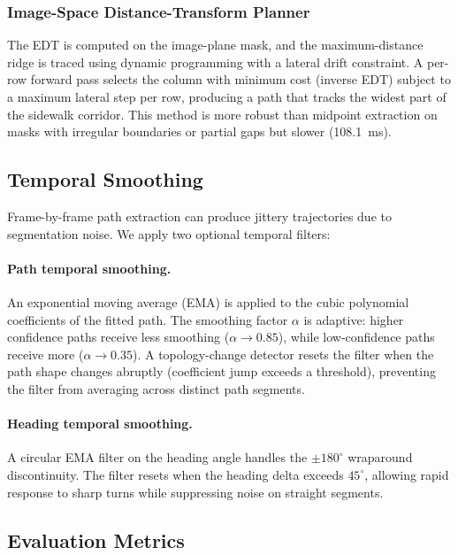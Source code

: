 \documentclass[a4paper,fleqn,10pt]{cas-dc}
\begin{document}
\subsubsection{Image-Space Distance-Transform Planner}
\label{sec:img_dt}

The EDT is computed on the image-plane mask, and the maximum-distance ridge is traced using dynamic programming with a lateral drift constraint. A per-row forward pass selects the column with minimum cost (inverse EDT) subject to a maximum lateral step per row, producing a path that tracks the widest part of the sidewalk corridor. This method is more robust than midpoint extraction on masks with irregular boundaries or partial gaps but slower (\SI{108.1}{ms}).


\subsection{Temporal Smoothing}
\label{sec:temporal_smoothing}

Frame-by-frame path extraction can produce jittery trajectories due to segmentation noise. We apply two optional temporal filters:

\paragraph{Path temporal smoothing.}
An exponential moving average (EMA) is applied to the cubic polynomial coefficients of the fitted path. The smoothing factor $\alpha$ is adaptive: higher confidence paths receive less smoothing ($\alpha \to 0.85$), while low-confidence paths receive more ($\alpha \to 0.35$). A topology-change detector resets the filter when the path shape changes abruptly (coefficient jump exceeds a threshold), preventing the filter from averaging across distinct path segments.

\paragraph{Heading temporal smoothing.}
A circular EMA filter on the heading angle handles the $\pm 180^\circ$ wraparound discontinuity. The filter resets when the heading delta exceeds $45^\circ$, allowing rapid response to sharp turns while suppressing noise on straight segments.


\subsection{Evaluation Metrics}
\label{sec:metrics}
\end{document}
